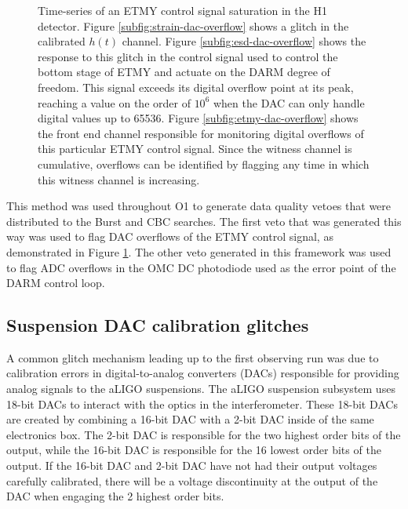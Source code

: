 \begin{figure}[ht!]
\caption[ETMY saturation]{Time-series of an ETMY control signal saturation in the 
         H1 detector. Figure \ref{subfig:strain-dac-overflow} shows a glitch in 
         the calibrated $h(t)$ channel. Figure \ref{subfig:esd-dac-overflow} shows 
         the response to this glitch in the control signal used to control the bottom 
         stage of ETMY and actuate on the DARM degree of freedom. This signal 
         exceeds  
         its digital overflow point at its peak, reaching a value on the order of 
         $10^6$ when the DAC can only handle digital values up to 65536.  
         Figure \ref{subfig:etmy-dac-overflow} shows the front end channel responsible 
         for monitoring digital overflows of this particular ETMY control signal. 
         Since the witness channel is cumulative, overflows can be identified by 
         flagging any time in which this witness channel is increasing. }
\label{fig:dac-overflow}
\end{figure}

This method was used throughout O1 to generate data quality vetoes that 
were distributed to the Burst and CBC searches. The first veto that was 
generated this way was used to flag DAC overflows of the ETMY control signal, 
as demonstrated 
in Figure \ref{fig:dac-overflow}. The other veto generated in this framework 
was used to flag ADC overflows in the OMC DC photodiode used as the error 
point of the DARM control loop. 

\subsection{Suspension DAC calibration glitches}\label{sec:DAC-calibration}

A common glitch mechanism leading up to the first observing run 
was due to calibration errors in 
digital-to-analog converters (DACs) responsible for providing analog signals 
to the aLIGO suspensions. The aLIGO suspension subsystem uses 18-bit DACs 
to interact with the optics in the interferometer. These 18-bit DACs are 
created by combining a 16-bit DAC with a 2-bit DAC inside of the same 
electronics box. The 2-bit DAC is responsible for the two highest order 
bits of the output, while the 16-bit DAC is responsible for the 16 lowest 
order bits of the output. If the 16-bit DAC and 2-bit DAC have not had 
their output voltages carefully calibrated, there will be a voltage discontinuity 
at the output of the DAC when engaging the 2 highest order bits. 

